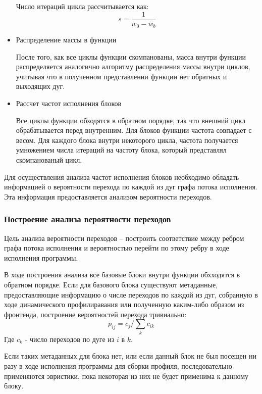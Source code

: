 \begin{itemize}
        Число итераций цикла рассчитывается как:
        $$ s = \frac{1}{w_0 - w_b} $$

    \item{Распределение массы в функции}

        После того, как все циклы функции скомпанованы, масса внутри функции распределяется аналогично алгоритму распределения массы внутри циклов, учитывая что в полученном представлении функции нет обратных и выходящих дуг.

    \item{Рассчет частот исполнения блоков}

        Все циклы функции обходятся в обратном порядке, так что внешний цикл обрабатывается перед внутренним.
        Для блоков функции частота совпадает с весом.
        Для каждого блока внутри некоторого цикла, частота получается умножением числа итераций на частоту блока, который представлял скомпанованый цикл.

\end{itemize}

Для осуществления анализа частот исполнения блоков необходимо обладать информацией о вероятности перехода по каждой из дуг графа потока исполнения.
Эта информация предоставляется анализом вероятности переходов.

\subsubsection{Построение анализа вероятности переходов}

Цель анализа вероятности переходов -- построить соответствие между ребром графа потока исполнения и вероятностью перейти по этому ребру в ходе исполнения программы.

В ходе построения  анализа все базовые блоки внутри функции обхходятся в обратном порядке.
Если для базового блока существуют метаданные, предоставляющие информацию о числе переходов по каждой из дуг, собранную в ходе динамического профилиравания или полученную каким-либо образом из фронтенда, построение вероятностей перехода тривиально:
$$ p_{ij} = c_{j} / \sum_k{c_{ik}} $$
Где $c_k$ - число переходов по дуге из $i$ в $k$.

Если таких метаданных для блока нет, или если данный блок не был посещен ни разу в ходе исполнения программы для сборки профиля, последовательно применяются эвристики, пока некоторая из них не будет применима к данному блоку.

